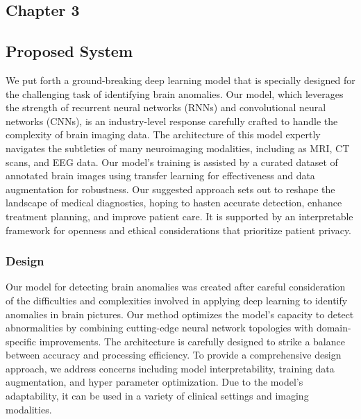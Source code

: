 \begin{center}
\chapter{{\huge \textbf{Chapter 3}}}
\end{center}
\section{Proposed System}

We put forth a ground-breaking deep learning model that is specially designed for the challenging task of identifying brain anomalies. Our model, which leverages the strength of recurrent neural networks (RNNs) and convolutional neural networks (CNNs), is an industry-level response carefully crafted to handle the complexity of brain imaging data. The architecture of this model expertly navigates the subtleties of many neuroimaging modalities, including as MRI, CT scans, and EEG data. Our model's training is assisted by a curated dataset of annotated brain images using transfer learning for effectiveness and data augmentation for robustness. Our suggested approach sets out to reshape the landscape of medical diagnostics, hoping to hasten accurate detection, enhance treatment planning, and improve patient care. It is supported by an interpretable framework for openness and ethical considerations that prioritize patient privacy.

\subsection{Design}
Our model for detecting brain anomalies was created after careful consideration of the difficulties and complexities involved in applying deep learning to identify anomalies in brain pictures. Our method optimizes the model's capacity to detect abnormalities by combining cutting-edge neural network topologies with domain-specific improvements. The architecture is carefully designed to strike a balance between accuracy and processing efficiency. To provide a comprehensive design approach, we address concerns including model interpretability, training data augmentation, and hyper parameter optimization. Due to the model's adaptability, it can be used in a variety of clinical settings and imaging modalities.

